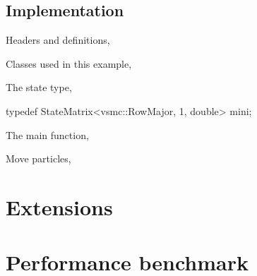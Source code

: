 \subsection{Implementation}
\label{sub:Implementation}

Headers and definitions,


Classes used in this example,


The state type,
\begin{cppcode}
typedef StateMatrix<vsmc::RowMajor, 1, double> mini;
\end{cppcode}

The main function,


Move particles,


\section{Extensions}
\label{sec:Extensions}

\section{Performance benchmark}
\label{sec:Performance benchmark}

